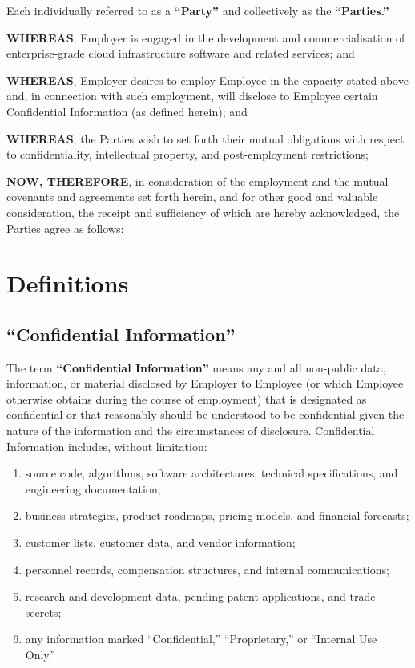 \documentclass[11pt,a4paper]{article}
\begin{document}
\vspace{10pt}

\noindent
Each individually referred to as a \textbf{``Party''} and collectively as the
\textbf{``Parties.''}

\medskip

\noindent
\textbf{WHEREAS}, Employer is engaged in the development and commercialisation of
enterprise-grade cloud infrastructure software and related services; and

\medskip

\noindent
\textbf{WHEREAS}, Employer desires to employ Employee in the capacity stated above
and, in connection with such employment, will disclose to Employee certain Confidential
Information (as defined herein); and

\medskip

\noindent
\textbf{WHEREAS}, the Parties wish to set forth their mutual obligations with respect
to confidentiality, intellectual property, and post-employment restrictions;

\medskip

\noindent
\textbf{NOW, THEREFORE}, in consideration of the employment and the mutual covenants
and agreements set forth herein, and for other good and valuable consideration, the
receipt and sufficiency of which are hereby acknowledged, the Parties agree as follows:

\section{Definitions}

\subsection{``Confidential Information''}
\noindent
The term \textbf{``Confidential Information''} means any and all non-public data,
information, or material disclosed by Employer to Employee (or which Employee otherwise
obtains during the course of employment) that is designated as confidential or that
reasonably should be understood to be confidential given the nature of the information
and the circumstances of disclosure. Confidential Information includes, without
limitation:

\begin{enumerate}[label=(\alph*), leftmargin=2em, itemsep=2pt]
  \item source code, algorithms, software architectures, technical specifications, and
        engineering documentation;
  \item business strategies, product roadmaps, pricing models, and financial forecasts;
  \item customer lists, customer data, and vendor information;
  \item personnel records, compensation structures, and internal communications;
  \item research and development data, pending patent applications, and trade secrets;
  \item any information marked ``Confidential,'' ``Proprietary,'' or ``Internal Use Only.''
\end{enumerate}
\end{document}

